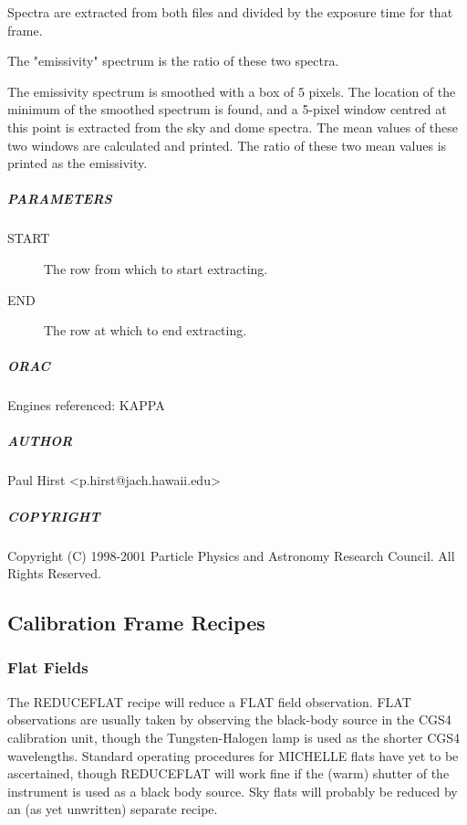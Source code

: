 \documentclass[twoside,11pt]{article}
\renewcommand{\_}{\texttt{\symbol{95}}}
\begin{document}
Spectra are extracted from both files and divided by the exposure time
for that frame.



The "emissivity" spectrum is the ratio of these two spectra.



The emissivity spectrum is smoothed with a box of 5 pixels.  The
location of the minimum of the smoothed spectrum is found, and a
5-pixel window centred at this point is extracted from the sky and
dome spectra.  The mean values of these two windows are calculated and
printed.  The ratio of these two mean values is printed as the
emissivity.

\subparagraph*{PARAMETERS\label{_EMISSIVITY__PARAMETERS}}\begin{description}
\item[START] \mbox{}

The row from which to start extracting.

\item[END] \mbox{}

The row at which to end extracting.

\end{description}
\subparagraph*{ORAC\label{_EMISSIVITY__ORAC}}

Engines referenced: KAPPA

\subparagraph*{AUTHOR\label{_EMISSIVITY__AUTHOR}}

Paul Hirst <p.hirst@jach.hawaii.edu>

\subparagraph*{COPYRIGHT\label{_EMISSIVITY__COPYRIGHT}}

Copyright (C) 1998-2001 Particle Physics and Astronomy Research
Council. All Rights Reserved.


\subsection{Calibration Frame Recipes}

\subsubsection{Flat Fields}

The REDUCE\_FLAT recipe will reduce a FLAT field observation. FLAT
observations are usually taken by observing the black-body source in
the CGS4 calibration unit, though the Tungsten-Halogen lamp is used as
the shorter CGS4 wavelengths. Standard operating procedures for
MICHELLE flats have yet to be ascertained, though REDUCE\_FLAT will
work fine if the (warm) shutter of the instrument is used as a black
body source. Sky flats will probably be reduced by an (as yet
unwritten) separate recipe.
\end{document}

